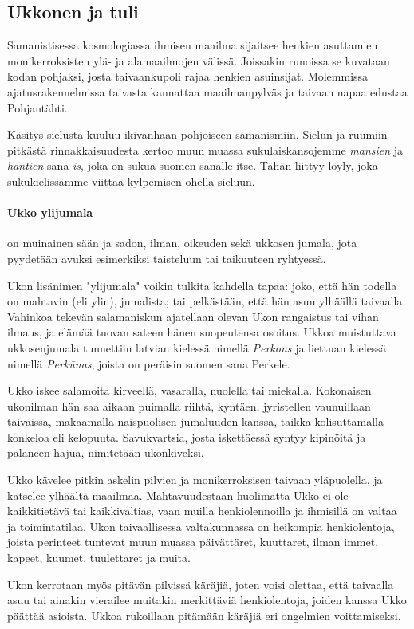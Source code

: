 \subsection{Ukkonen ja tuli}

    Samanistisessa kosmologiassa ihmisen maailma sijaitsee henkien asuttamien monikerroksisten ylä-
    ja alamaailmojen välissä. Joissakin runoissa se kuvataan kodan pohjaksi, josta taivaankupoli
    rajaa henkien asuinsijat. Molemmissa ajatusrakennelmissa taivasta kannattaa maailmanpylväs
    ja taivaan napaa edustaa Pohjantähti. \par
    Käsitys sielusta kuuluu ikivanhaan pohjoiseen samanismiin. Sielun ja ruumiin pitkästä
    rinnakkaisuudesta kertoo muun muassa sukulaiskansojemme \emph{mansien} ja \emph{hantien} sana
    \emph{is}, joka on sukua suomen sanalle itse. Tähän liittyy löyly, joka sukukielissämme viittaa
    kylpemisen ohella sieluun.
  \paragraph{Ukko ylijumala} on muinainen sään ja sadon, ilman, oikeuden sekä ukkosen jumala, jota
    pyydetään avuksi esimerkiksi taisteluun tai taikuuteen ryhtyessä. \par
    Ukon lisänimen "ylijumala" voikin tulkita kahdella tapaa: joko, että hän todella on mahtavin
    (eli ylin), jumalista; tai pelkästään, että hän asuu ylhäällä taivaalla. Vahinkoa tekevän
    salamaniskun ajatellaan olevan Ukon rangaistus tai vihan ilmaus, ja elämää tuovan sateen
    hänen suopeutensa osoitus. Ukkoa muistuttava ukkosenjumala tunnettiin latvian kielessä nimellä
    \emph{Perkons} ja liettuan kielessä nimellä \emph{Perkūnas}, joista on peräisin suomen sana
    Perkele. \par
    Ukko iskee salamoita kirveellä, vasaralla, nuolella tai miekalla. Kokonaisen ukonilman hän saa
    aikaan puimalla riihtä, kyntäen, jyristellen vaunuillaan taivaissa, makaamalla naispuolisen
    jumaluuden kanssa, taikka kolisuttamalla konkeloa eli kelopuuta. Savukvartsia, josta
    iskettäessä syntyy kipinöitä ja palaneen hajua, nimitetään ukonkiveksi. \par
    Ukko kävelee pitkin askelin pilvien ja monikerroksisen taivaan yläpuolella, ja katselee
    ylhäältä maailmaa. Mahtavuudestaan huolimatta Ukko ei ole kaikkitietävä tai kaikkivaltias, vaan
    muilla henkiolennoilla ja ihmisillä on valtaa ja toimintatilaa. Ukon taivaallisessa
    valtakunnassa on heikompia henkiolentoja, joista perinteet tuntevat muun muassa päivättäret,
    kuuttaret, ilman immet, kapeet, kuumet, tuulettaret ja muita. \par
    Ukon kerrotaan myös pitävän pilvissä käräjiä, joten voisi olettaa, että taivaalla asuu tai
    ainakin vierailee muitakin merkittäviä henkiolentoja, joiden kanssa Ukko päättää asioista.
    Ukkoa rukoillaan pitämään käräjiä eri ongelmien voittamiseksi.

